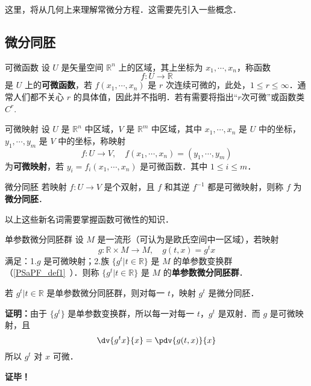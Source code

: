 
这里，将从几何上来理解常微分方程．这需要先引入一些概念．
\subsection{微分同胚}
\begin{definition}{可微函数}
设 $U$ 是矢量空间 $\mathbb R^n$ 上的区域，其上坐标为 $x_1,\cdots,x_n$，称函数
\begin{equation}
f:U\rightarrow\mathbb R
\end{equation}
是 $U$ 上的\textbf{可微函数}，若 $f(x_1,\cdots,x_n)$ 是 $r$ 次连续可微的，此处，$1\leq r\leq\infty$．通常人们都不关心 $r$ 的具体值，因此并不指明．若有需要将指出“$r$次可微”或函数类 $C^r$.
\end{definition}
\begin{definition}{可微映射}
设 $U$ 是 $\mathbb R^n$ 中区域，$V$ 是 $\mathbb R^m$ 中区域，其中 $x_1,\cdots,x_n$ 是 $U$ 中的坐标，$y_1,\cdots,y_m$ 是 $V$ 中的坐标，称映射
\begin{equation}
f:U\rightarrow V,\quad f(x_1,\cdots,x_n)=(y_1,\cdots,y_m)
\end{equation}
为\textbf{可微映射}，若 $y_i=f_i(x_1,\cdots,x_n)$ 是可微函数．其中 $1\leq i\leq m$．
\end{definition}
\begin{definition}{微分同胚}
若映射 $f:U\rightarrow V$ 是个双射，且 $f$ 和其逆 $f^{-1}$ 都是可微映射，则称 $f$ 为\textbf{微分同胚}．
\end{definition}
以上这些新名词需要掌握函数可微性的知识．
\begin{definition}{单参数微分同胚群}
设 $M$ 是一流形（可认为是欧氏空间中一区域），若映射
\begin{equation}
g:\mathbb R\times M\rightarrow M,\quad g(t,x) =g^t x
\end{equation}
满足：1.$g$ 是可微映射；2.族 $\{g^t|t\in\mathbb R\}$ 是 $M$ 的单参数变换群（\autoref{PSaPF_def1}~）．则称 $\{g^t|t\in\mathbb R\}$ 是 $M$ 的\textbf{单参数微分同胚群}．
\end{definition}
\begin{theorem}{}
若 ${g^t|t\in\mathbb R}$ 是单参数微分同胚群，则对每一 $t$，映射 $g^t$ 是微分同胚．
\end{theorem}
\textbf{证明：}由于 $\{g^t\}$ 是单参数变换群，所以每一对每一 $t$，$g^t$ 是双射．而 $g$ 是可微映射，且
\begin{equation}
\dv{g^tx}{x}=\pdv{g(t,x)}{x}
\end{equation}
所以 $g^t$ 对 $x$ 可微．

\textbf{证毕！}